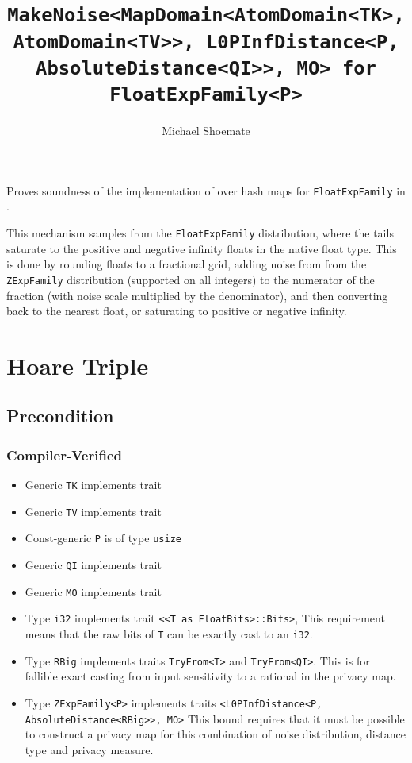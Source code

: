 \documentclass{article}
\title{\texttt{MakeNoise<MapDomain<AtomDomain<TK>, AtomDomain<TV>>, L0PInfDistance<P, AbsoluteDistance<QI>>, MO> for FloatExpFamily<P>}}
\author{Michael Shoemate}
\date{}
\begin{document}
\maketitle

\contrib
Proves soundness of the implementation of  over hash maps
for \texttt{FloatExpFamily} in .

This mechanism samples from the \texttt{FloatExpFamily} distribution, 
where the tails saturate to the positive and negative infinity floats in the native float type.
This is done by rounding floats to a fractional grid, 
adding noise from from the \texttt{ZExpFamily} distribution (supported on all integers) 
to the numerator of the fraction (with noise scale multiplied by the denominator),
and then converting back to the nearest float, or saturating to positive or negative infinity.

\section{Hoare Triple}
\subsection*{Precondition}
\subsubsection*{Compiler-Verified}

\begin{itemize}
    \item Generic \texttt{TK} implements trait 
    \item Generic \texttt{TV} implements trait 
    \item Const-generic \texttt{P} is of type \texttt{usize}
    \item Generic \texttt{QI} implements trait 
    \item Generic \texttt{MO} implements trait 
    \item Type \texttt{i32} implements trait \texttt{<<T as FloatBits>::Bits>},
        This requirement means that the raw bits of \texttt{T} can be exactly cast to an \texttt{i32}.
    \item Type \texttt{RBig} implements traits \texttt{TryFrom<T>} and \texttt{TryFrom<QI>}.
        This is for fallible exact casting from input sensitivity to a rational in the privacy map.
    \item Type \texttt{ZExpFamily<P>} implements traits \texttt{<L0PInfDistance<P, AbsoluteDistance<RBig>>, MO>}
        This bound requires that it must be possible to construct a privacy map for this combination of noise distribution, distance type and privacy measure.
\end{itemize}
\end{document}
